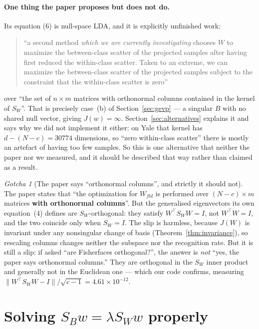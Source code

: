 \documentclass[11pt]{article}
\theoremstyle{definition}
\theoremstyle{remark}
\newtheorem*{gotcha}{Gotcha}
\newcommand{\Sw}{S_W}
\newcommand{\Sb}{S_B}
\begin{document}
\paragraph{One thing the paper proposes but does not do.}
Its equation (6) is null-space LDA, and it is explicitly unfinished work:
\begin{quote}
``a second method \emph{which we are currently investigating} chooses $W$ to
maximize the between-class scatter of the projected samples after having first
reduced the within-class scatter. Taken to an extreme, we can maximize the
between-class scatter of the projected samples subject to the constraint that
the within-class scatter is zero''
\end{quote}
over ``the set of $n\times m$ matrices with orthonormal columns contained in the
kernel of $\Sw$''. That is precisely case~(b) of
Section~\ref{sec:gevp} --- a singular $B$ with no shared null vector, giving
$J(w)=\infty$. Section~\ref{sec:alternatives} explains it and says why we did
not implement it either: on Yale that kernel has $d-(N-c)=30774$ dimensions, so
``zero within-class scatter'' there is mostly an artefact of having too few
samples. So this is one alternative that neither the paper nor we measured, and
it should be described that way rather than claimed as a result.

\begin{gotcha}[The paper says ``orthonormal columns'', and strictly it should not]
The paper states that ``the optimization for $W_{fld}$ is performed over
$(N-c)\times m$ matrices \textbf{with orthonormal columns}''. But the
generalised eigenvectors its own equation~(4) defines are
$\Sw$-orthogonal: they satisfy $W^{\!\top}\Sw W = I$, not $W^{\!\top}W = I$, and
the two coincide only when $\Sw = I$. The slip is harmless, because $J(W)$ is
invariant under any nonsingular change of basis
(Theorem~\ref{thm:invariance}), so rescaling columns changes neither the
subspace nor the recognition rate. But it is still a slip: if asked ``are
Fisherfaces orthogonal?'', the answer is \emph{not} ``yes, the paper says
orthonormal columns.'' They are orthogonal in the $\Sw$ inner product and
generally not in the Euclidean one --- which our code confirms, measuring
$\|W^{\!\top}\Sw W - I\|/\sqrt{c-1} = 4.61\times10^{-12}$.
\end{gotcha}

\section{Solving \texorpdfstring{$\Sb w=\lambda\Sw w$}{Sb w = lambda Sw w} properly}
\label{sec:solve}
\end{document}
